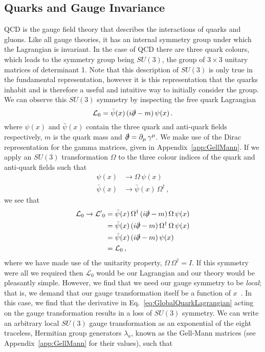 \subsection{Quarks and Gauge Invariance}
QCD is the gauge field theory that describes the interactions of quarks and gluons. Like all gauge theories, it has an internal symmetry group under which the Lagrangian is invariant. In the case of QCD there are three quark colours, which leads to the symmetry group being $SU(3)$, the group of $3\times 3$ unitary matrices of determinant 1. Note that this description of $SU(3)$ is only true in the fundamental representation, however it is this representation that the quarks inhabit and is therefore a useful and intuitive way to initially consider the group. We can observe this $SU(3)$ symmetry by inspecting the free quark Lagrangian
%
\begin{equation}
\mathcal{L}_0 = \bar{\psi}(x)\,(i\slashed{\partial}-m)\,\psi(x)\,.
\label{eq:GlobalQuarkLagrangian}
\end{equation}
%
where $\psi(x)$ and $\bar{\psi}(x)$ contain the three quark and anti-quark fields respectively, $m$ is the quark mass and $\slashed{\partial}=\partial_\mu\,\gamma^\mu$. We make use of the Dirac representation for the gamma matrices, given in Appendix~\ref{app:GellMann}. If we apply an $SU(3)$ transformation $\Omega$ to the three colour indices of the quark and anti-quark fields such that
%
\begin{align*}
\psi(x)&\rightarrow\Omega\,\psi(x)\\
\bar{\psi}(x)&\rightarrow \bar{\psi}(x)\,\Omega^\dagger\, ,
\end{align*}
%
we see that
%
\begin{align*}
\mathcal{L}_0\rightarrow\mathcal{L'}_0&=\bar{\psi}(x)\,\Omega^\dag\,(i\slashed{\partial}-m)\,\Omega\,\psi(x)\\
&= \bar{\psi}(x)\,(i\slashed{\partial}-m)\,\Omega^\dag\,\Omega\,\psi(x)\\
&= \bar{\psi}(x)\,(i\slashed{\partial}-m)\,\psi(x)\\
&= \mathcal{L}_0\, ,
\end{align*}
%
where we have made use of the unitarity property, $\Omega\,\Omega^\dag = I$. If this symmetry were all we required then $\mathcal{L}_0$ would be our Lagrangian and our theory would be pleasantly simple. However, we find that we need our gauge symmetry to be \textit{local}; that is, we demand that our gauge transformation itself be a function of $x$~\cite{peskin2018introduction}. In this case, we find that the derivative in Eq.~\eqref{eq:GlobalQuarkLagrangian} acting on the gauge transformation results in a loss of $SU(3)$ symmetry. We can write an arbitrary local $SU(3)$ gauge transformation as an exponential of the eight traceless, Hermitian group generators $\lambda_a$, known as the Gell-Mann matrices (see Appendix~\ref{app:GellMann} for their values), such that 
